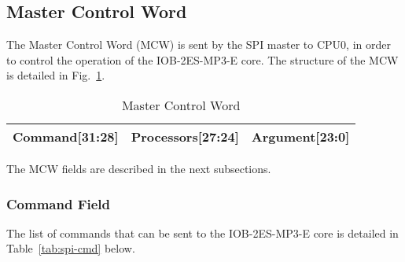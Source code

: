 \documentclass{rep}
\theoremstyle{plain}
\begin{document}
\subsection{Master Control Word}

The Master Control Word (MCW) is sent by the SPI master to CPU0, in order to
control the operation of the IOB-2ES-MP3-E core. The structure of the MCW is
detailed in Fig.~\ref{tab:spi-ctr}.

\begin{table}[H]
  \begin{center}
    \begin{tabular}{|l|l|l|}
      \hline
      \hline
      \rowcolor{iob-green}
      \textbf{Command[31:28]} & \textbf{Processors[27:24]}  & \textbf{Argument[23:0]} \\
      \hline
      \hline
    \end{tabular}
    \caption{Master Control Word}
    \label{tab:spi-ctr}
  \end{center}
\end{table}

The MCW fields are described in the next subsections.

\clearpage 

\subsubsection{Command Field}

The list of commands that can be sent to the IOB-2ES-MP3-E core is
detailed in Table~\ref{tab:spi-cmd} below.
\end{document}
